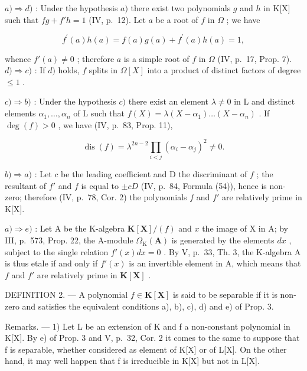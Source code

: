 \(a) \Rightarrow d)\) : Under the hypothesis \(a)\) there exist two polynomials \(g\) and \(h\) in K{[}X{]} such that \(fg + f'h = 1\) (IV, p.~12). Let \(a\) be a root of \(f\) in \(\Omega\) ; we have

\[
f ^ {\prime} (a) h (a) = f (a) g (a) + f ^ {\prime} (a) h (a) = 1,
\]

whence \(f'(a) \neq 0\) ; therefore \(a\) is a simple root of \(f\) in \(\Omega\) (IV, p.~17, Prop. 7). \(d) \Rightarrow c)\) : If \(d)\) holds, \(f\) splits in \(\Omega[X]\) into a product of distinct factors of degree \(\leqslant 1\) .

\(c) \Rightarrow b)\) : Under the hypothesis \(c)\) there exist an element \(\lambda \neq 0\) in L and distinct elements \(\alpha_{1}, \ldots, \alpha_{n}\) of L such that \(f(X) = \lambda(X - \alpha_{1}) \ldots (X - \alpha_{n})\) . If \(\deg(f) > 0\) , we have (IV, p.~83, Prop. 11),

\[
\operatorname{dis} (f) = \lambda^ {2 n - 2} \prod_ {i <   j} (\alpha_ {i} - \alpha_ {j}) ^ {2} \neq 0.
\]

\(b) \Rightarrow a)\) : Let \(c\) be the leading coefficient and D the discriminant of \(f\) ; the resultant of \(f'\) and \(f\) is equal to \(\pm cD\) (IV, p.~84, Formula (54)), hence is non-zero; therefore (IV, p.~78, Cor. 2) the polynomials \(f\) and \(f'\) are relatively prime in K{[}X{]}.

\(a) \Rightarrow e)\) : Let A be the K-algebra \(\mathbf{K}[\mathbf{X}] / (f)\) and \(x\) the image of X in A; by III, p.~573, Prop. 22, the A-module \(\Omega_{\mathrm{K}}(\mathbf{A})\) is generated by the elements \(dx\) , subject to the single relation \(f'(x) dx = 0\) . By V, p.~33, Th. 3, the K-algebra A is thus etale if and only if \(f'(x)\) is an invertible element in A, which means that \(f\) and \(f'\) are relatively prime in \(\mathbf{K}[\mathbf{X}]\) .

DEFINITION 2. --- A polynomial \(f \in \mathbf{K}[\mathbf{X}]\) is said to be separable if it is non-zero and satisfies the equivalent conditions a), b), c), d) and e) of Prop. 3.

Remarks. --- 1) Let L be an extension of K and f a non-constant polynomial in K{[}X{]}. By e) of Prop. 3 and V, p.~32, Cor. 2 it comes to the same to suppose that f is separable, whether considered as element of K{[}X{]} or of L{[}X{]}. On the other hand, it may well happen that f is irreducible in K{[}X{]} but not in L{[}X{]}.

